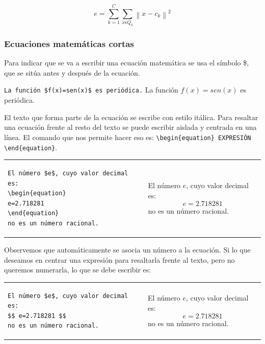 \documentclass[10pt,a4paper]{article}
\begin{document}
\begin{equation}
e=\sum_{k=1}^{C}\sum_{x\epsilon Q_{k}}\left \|x-c_{k} \right \|^{2}
\label{Equation_01}
\end{equation}

\subsubsection{Ecuaciones matemáticas cortas}%

Para indicar que se va a escribir una ecuación matemática se usa el símbolo \$, que se sitúa antes y después de la ecuación. 

\begin{center}
\texttt{La función \$\texttt{f(x)=sen(x)}\$ es periódica.} \hspace{1cm}
La función $f(x)=sen(x)$  es periódica.      
\end{center}  

\bigskip 

El texto que forma parte de la ecuación se escribe con estilo itálica. Para resaltar una ecuación frente al resto del texto se puede escribir aislada y centrada en una línea. El comando que nos permite hacer eso es: \verb/\begin{equation} EXPRESIÓN \end{equation}/.

\bigskip

\begin{center}
\begin{tabular}{m{8.5cm}m{7cm}}
\begin{verbatim}
El número $e$, cuyo valor decimal es:
\begin{equation}
e=2.718281
\end{equation}
no es un número racional. 
\end{verbatim}
&
El número $e$, cuyo valor decimal es:
\begin{equation}
e=2.718281
\end{equation}
no es un número racional.            
\end{tabular}
\end{center}

Observemos que automáticamente se asocia un número a la ecuación. Si lo que deseamos en centrar una expresión para resaltarla frente al texto, pero no queremos numerarla, lo que se debe escribir es:

\begin{center}
\begin{tabular}{m{8.5cm}m{6cm}}
\begin{verbatim}
El número $e$, cuyo valor decimal es:
$$ e=2.718281 $$
no es un número racional. 
\end{verbatim}
&
El número $e$, cuyo valor decimal es:
$$ e=2.718281 $$
no es un número racional.            
\end{tabular}
\end{center}
\end{document}
